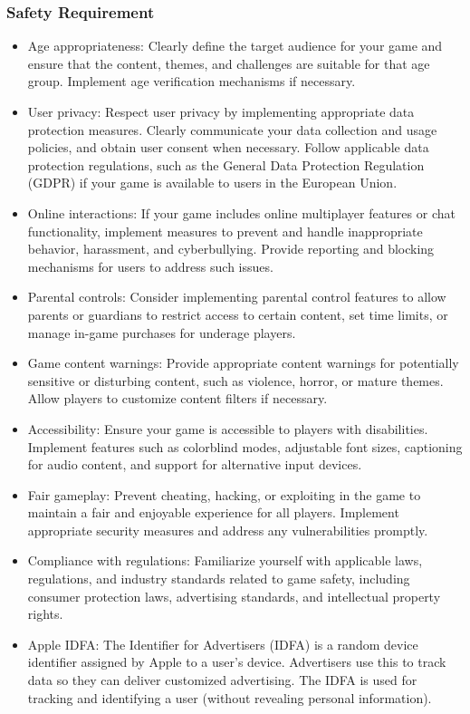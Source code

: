 \documentclass[12pt]{report}
\begin{document}
\subsubsection{ Safety Requirement}
\normalsize\begin{itemize}
    \item Age appropriateness: Clearly define the target audience for your game and ensure that the content, themes, and challenges are suitable for that age group. Implement age verification mechanisms if necessary.
    \item User privacy: Respect user privacy by implementing appropriate data protection measures. Clearly communicate your data collection and usage policies, and obtain user consent when necessary. Follow applicable data protection regulations, such as the General Data Protection Regulation (GDPR) if your game is available to users in the European Union.
    \item Online interactions: If your game includes online multiplayer features or chat functionality, implement measures to prevent and handle inappropriate behavior, harassment, and cyberbullying. Provide reporting and blocking mechanisms for users to address such issues.
    \item Parental controls: Consider implementing parental control features to allow parents or guardians to restrict access to certain content, set time limits, or manage in-game purchases for underage players.
    \item Game content warnings: Provide appropriate content warnings for potentially sensitive or disturbing content, such as violence, horror, or mature themes. Allow players to customize content filters if necessary.
    \item Accessibility: Ensure your game is accessible to players with disabilities. Implement features such as colorblind modes, adjustable font sizes, captioning for audio content, and support for alternative input devices.
    \item Fair gameplay: Prevent cheating, hacking, or exploiting in the game to maintain a fair and enjoyable experience for all players. Implement appropriate security measures and address any vulnerabilities promptly.
    \item Compliance with regulations: Familiarize yourself with applicable laws, regulations, and industry standards related to game safety, including consumer protection laws, advertising standards, and intellectual property rights.
    \item Apple IDFA: The Identifier for Advertisers (IDFA) is a random device identifier assigned by Apple to a user’s device. Advertisers use this to track data so they can deliver customized advertising. The IDFA is used for tracking and identifying a user (without revealing personal information).

\end{itemize}
\end{document}
